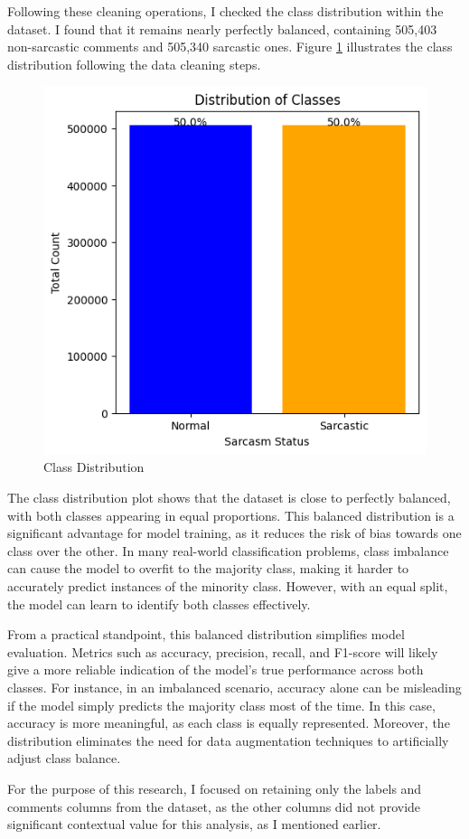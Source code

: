 Following these cleaning operations, I checked the class distribution within the dataset. I found that it remains nearly perfectly balanced, containing 505,403 non-sarcastic comments and 
505,340 sarcastic ones. Figure \ref{Fig_1} illustrates the class distribution following the data cleaning steps.

\begin{figure}
    \centering
    \includegraphics[width=0.5\linewidth]{img/class-dist.png}
    \caption{Class Distribution}
    \label{Fig_1}
\end{figure}

The class distribution plot shows that the dataset is close to perfectly balanced, with both classes appearing in equal proportions. This balanced distribution is a significant advantage 
for model training, as it reduces the risk of bias towards one class over the other. In many real-world classification problems, class imbalance can cause the model to overfit to the 
majority class, making it harder to accurately predict instances of the minority class. However, with an equal split, the model can learn to identify both classes effectively.

From a practical standpoint, this balanced distribution simplifies model evaluation. Metrics such as accuracy, precision, recall, and F1-score will likely give a more reliable indication 
of the model's true performance across both classes. For instance, in an imbalanced scenario, accuracy alone can be misleading if the model simply predicts the majority class most of the 
time. In this case, accuracy is more meaningful, as each class is equally represented. Moreover, the distribution eliminates the need for data augmentation techniques to artificially 
adjust class balance.

For the purpose of this research, I focused on retaining only the labels and comments columns from the dataset, as the other columns did not provide significant contextual value for this 
analysis, as I mentioned earlier.

